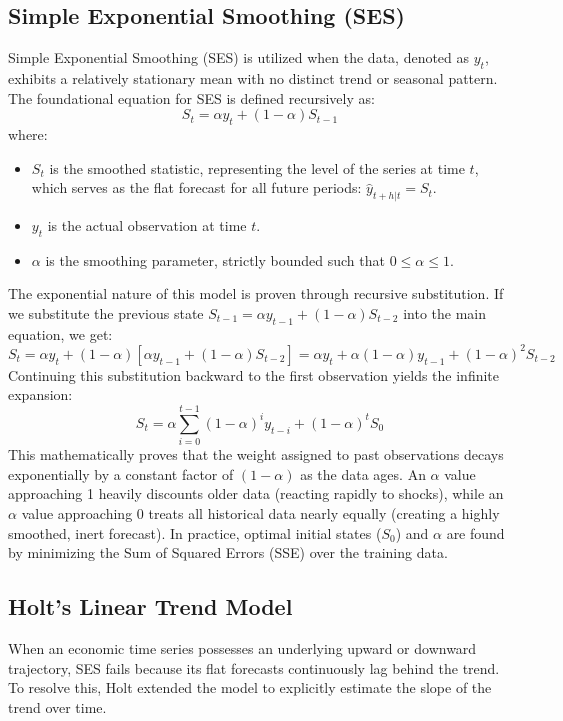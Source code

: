 \subsection{Simple Exponential Smoothing (SES)}
Simple Exponential Smoothing (SES) is utilized when the data, denoted as $y_t$, exhibits a relatively stationary mean with no distinct trend or seasonal pattern. The foundational equation for SES is defined recursively as:
\begin{equation}
    S_t = \alpha y_t + (1 - \alpha) S_{t-1}
\end{equation}
where:
\begin{itemize}
    \item $S_t$ is the smoothed statistic, representing the level of the series at time $t$, which serves as the flat forecast for all future periods: $\hat{y}_{t+h|t} = S_t$.
    \item $y_t$ is the actual observation at time $t$.
    \item $\alpha$ is the smoothing parameter, strictly bounded such that $0 \le \alpha \le 1$.
\end{itemize}

The exponential nature of this model is proven through recursive substitution. If we substitute the previous state $S_{t-1} = \alpha y_{t-1} + (1 - \alpha)S_{t-2}$ into the main equation, we get:
\begin{equation}
    S_t = \alpha y_t + (1 - \alpha)[\alpha y_{t-1} + (1 - \alpha)S_{t-2}] = \alpha y_t + \alpha(1-\alpha)y_{t-1} + (1-\alpha)^2 S_{t-2}
\end{equation}
Continuing this substitution backward to the first observation yields the infinite expansion:
\begin{equation}
    S_t = \alpha \sum_{i=0}^{t-1} (1-\alpha)^i y_{t-i} + (1-\alpha)^t S_0
\end{equation}
This mathematically proves that the weight assigned to past observations decays exponentially by a constant factor of $(1-\alpha)$ as the data ages. An $\alpha$ value approaching 1 heavily discounts older data (reacting rapidly to shocks), while an $\alpha$ value approaching 0 treats all historical data nearly equally (creating a highly smoothed, inert forecast). In practice, optimal initial states ($S_0$) and $\alpha$ are found by minimizing the Sum of Squared Errors (SSE) over the training data.

\subsection{Holt's Linear Trend Model}
When an economic time series possesses an underlying upward or downward trajectory, SES fails because its flat forecasts continuously lag behind the trend. To resolve this, Holt extended the model to explicitly estimate the slope of the trend over time.

